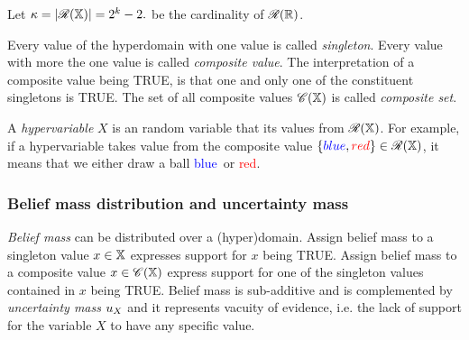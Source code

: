 \documentclass[a4paper,12pt]{article}
\theoremstyle{definition}
\numberwithin{equation}{section}
\newcommand{\red}{\textcolor{red}{red}}
\newcommand{\blue}{\textcolor{blue}{blue}}
\begin{document}
Let $\kappa = |\mathcal{R}(\mathbb{X})| = 2^k -2\text{.}$ be the cardinality of $\mathcal{R}(\mathbb{R})$.

Every value of the hyperdomain with one value is called \emph{singleton}. Every value with more the one value is called \emph{composite value}. The interpretation of a composite value being TRUE, is that one and only one of the constituent singletons is TRUE. The set of all composite values $\mathcal{C}(\mathbb{X})$ is called \emph{composite set}.

A \emph{hypervariable} $X$ is an random variable that its values from $\mathcal{R}(\mathbb{X})$. For example, if a hypervariable takes value from the composite value $\{\blue, \red\} \in \hdom{X}$, it means that we either draw a ball \blue\ or \red.

\subsubsection{Belief mass distribution and uncertainty mass}

\emph{Belief mass} can be distributed over a (hyper)domain. Assign belief mass to a singleton value $x \in \mathbb{X}$ expresses support for $x$ being TRUE. Assign belief mass to a composite value $x \in \mathcal{C}(\mathbb{X})$ express support for one of the singleton values contained in $x$ being TRUE. Belief mass is sub-additive and is complemented by \emph{uncertainty mass} $u_{X}$ and it represents
vacuity of evidence, i.e. the lack of support for the variable $X$ to have any specific value.
\end{document}
